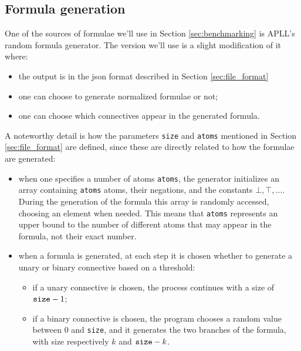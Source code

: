 \documentclass[a4paper, 12pt, tesi, english]{report}
\begin{document}
\subsection{Formula generation}\label{sec:formula_generator}
One of the sources of formulae we'll use in Section \ref{sec:benchmarking} is APLL's random formula generator.
The version we'll use is a slight modification of it where:
\begin{itemize}
	\item the output is in the json format described in Section \ref{sec:file_format}
	\item one can choose to generate normalized formulae or not;
	\item one can choose which connectives appear in the generated formula.
\end{itemize}
A noteworthy detail is how the parameters \texttt{size} and \texttt{atoms} mentioned in Section \ref{sec:file_format} are defined, since these are directly related to how the formulae are generated:
\begin{itemize}
	\item when one specifies a number of atoms \texttt{atoms}, the generator initializes an array containing \texttt{atoms} atoms, their negations, and the constants $\bot, \top, \dots$.
		During the generation of the formula this array is randomly accessed, choosing an element when needed.
		This means that \texttt{atoms} represents an upper bound to the number of different atoms that may appear in the formula, not their exact number.
	\item when a formula is generated, at each step it is chosen whether to generate a unary or binary connective based on a threshold:
		\begin{itemize}
			\item if a unary connective is chosen, the process continues with a size of $\text{\texttt{size}} - 1$;
			\item if a binary connective is chosen, the program chooses a random value between 0 and \texttt{size}, and it generates the two branches of the formula, with size respectively $k$ and $\text{\texttt{size}} - k$.
		\end{itemize}
\end{itemize}
\end{document}
